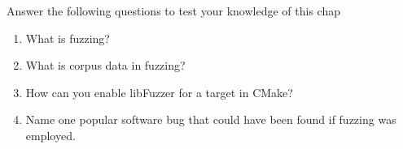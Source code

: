 Answer the following questions to test your knowledge of this chap

\begin{enumerate}
\item 
What is fuzzing?

\item 
What is corpus data in fuzzing?

\item 
How can you enable libFuzzer for a target in CMake?

\item 
Name one popular software bug that could have been found if fuzzing was employed.
\end{enumerate}